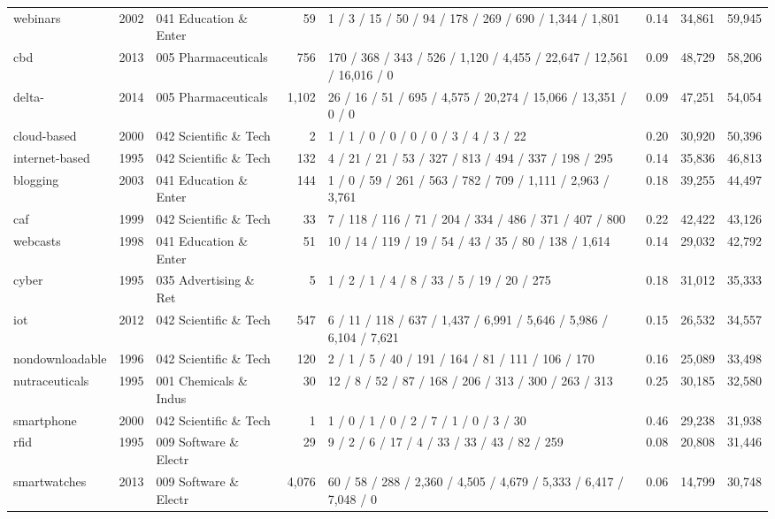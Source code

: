 \documentclass[11pt]{article}
\begin{document}
\begin{landscape}
{\begin{longtable}{@{}l c p{2.6cm} r p{6.2cm} r r r@{}}
webinars & 2002 & 041 Education \& Enter & 59 & \scriptsize{1 / 3 / 15 / 50 / 94 / 178 / 269 / 690 / 1,344 / 1,801} & 0.14 & 34,861 & 59,945 \\
cbd & 2013 & 005 Pharmaceuticals & 756 & \scriptsize{170 / 368 / 343 / 526 / 1,120 / 4,455 / 22,647 / 12,561 / 16,016 / 0} & 0.09 & 48,729 & 58,206 \\
delta- & 2014 & 005 Pharmaceuticals & 1,102 & \scriptsize{26 / 16 / 51 / 695 / 4,575 / 20,274 / 15,066 / 13,351 / 0 / 0} & 0.09 & 47,251 & 54,054 \\
cloud-based & 2000 & 042 Scientific \& Tech & 2 & \scriptsize{1 / 1 / 0 / 0 / 0 / 0 / 3 / 4 / 3 / 22} & 0.20 & 30,920 & 50,396 \\
internet-based & 1995 & 042 Scientific \& Tech & 132 & \scriptsize{4 / 21 / 21 / 53 / 327 / 813 / 494 / 337 / 198 / 295} & 0.14 & 35,836 & 46,813 \\
blogging & 2003 & 041 Education \& Enter & 144 & \scriptsize{1 / 0 / 59 / 261 / 563 / 782 / 709 / 1,111 / 2,963 / 3,761} & 0.18 & 39,255 & 44,497 \\
caf & 1999 & 042 Scientific \& Tech & 33 & \scriptsize{7 / 118 / 116 / 71 / 204 / 334 / 486 / 371 / 407 / 800} & 0.22 & 42,422 & 43,126 \\
webcasts & 1998 & 041 Education \& Enter & 51 & \scriptsize{10 / 14 / 119 / 19 / 54 / 43 / 35 / 80 / 138 / 1,614} & 0.14 & 29,032 & 42,792 \\
cyber & 1995 & 035 Advertising \& Ret & 5 & \scriptsize{1 / 2 / 1 / 4 / 8 / 33 / 5 / 19 / 20 / 275} & 0.18 & 31,012 & 35,333 \\
iot & 2012 & 042 Scientific \& Tech & 547 & \scriptsize{6 / 11 / 118 / 637 / 1,437 / 6,991 / 5,646 / 5,986 / 6,104 / 7,621} & 0.15 & 26,532 & 34,557 \\
nondownloadable & 1996 & 042 Scientific \& Tech & 120 & \scriptsize{2 / 1 / 5 / 40 / 191 / 164 / 81 / 111 / 106 / 170} & 0.16 & 25,089 & 33,498 \\
nutraceuticals & 1995 & 001 Chemicals \& Indus & 30 & \scriptsize{12 / 8 / 52 / 87 / 168 / 206 / 313 / 300 / 263 / 313} & 0.25 & 30,185 & 32,580 \\
smartphone & 2000 & 042 Scientific \& Tech & 1 & \scriptsize{1 / 0 / 1 / 0 / 2 / 7 / 1 / 0 / 3 / 30} & 0.46 & 29,238 & 31,938 \\
rfid & 1995 & 009 Software \& Electr & 29 & \scriptsize{9 / 2 / 6 / 17 / 4 / 33 / 33 / 43 / 82 / 259} & 0.08 & 20,808 & 31,446 \\
smartwatches & 2013 & 009 Software \& Electr & 4,076 & \scriptsize{60 / 58 / 288 / 2,360 / 4,505 / 4,679 / 5,333 / 6,417 / 7,048 / 0} & 0.06 & 14,799 & 30,748 \\

\end{longtable}}
\end{landscape}
\end{document}
